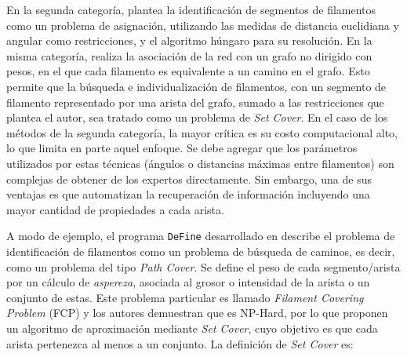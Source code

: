 En la segunda categor\'ia, \cite{cerda2014geometrical} plantea la identificaci\'on de segmentos de filamentos como un problema de asignaci\'on, utilizando las medidas de distancia euclidiana y angular como restricciones, y el algoritmo h\'ungaro para su resoluci\'on. En la misma categor\'ia, \cite{breuer2015define} realiza la asociaci\'on de la red con un grafo no dirigido con pesos, en el que cada filamento es equivalente a un camino en el grafo. Esto permite que la b\'usqueda e individualizaci\'on de filamentos, con un segmento de filamento representado por una arista del grafo, sumado a las restricciones que plantea el autor, sea tratado como un problema de {\it Set Cover}. En el caso de los m\'etodos de la segunda categor\'ia, la mayor cr\'itica es su costo computacional alto, lo que limita en parte aquel enfoque. Se debe agregar que los par\'ametros utilizados por estas t\'ecnicas (\'angulos o  distancias m\'aximas entre filamentos) son complejas de obtener de los expertos directamente. Sin embargo, una de sus ventajas es que automatizan la recuperaci\'on de informaci\'on incluyendo una mayor cantidad de propiedades a cada arista. 



\medskip

A modo de ejemplo, el programa \texttt{DeFine} desarrollado en \cite{breuer2015define} describe el problema de identificaci\'on de filamentos como un problema de b\'usqueda de caminos, es decir, como un problema del tipo {\it Path Cover}. Se define el peso de cada segmento/arista por un c\'alculo de {\it aspereza}, asociada al grosor o intensidad de la arista o un conjunto de estas.
Este problema particular es llamado {\it Filament Covering Problem} (FCP) y los autores demuestran que es NP-Hard, por lo que proponen un algoritmo de aproximaci\'on mediante \textit{Set Cover}, cuyo objetivo es que cada arista pertenezca al menos a un conjunto. La definici\'on de {\it Set Cover} es:


